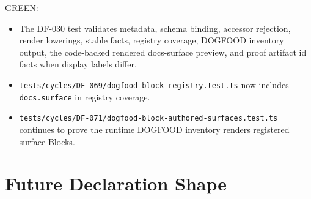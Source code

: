 GREEN:

\begin{itemize}
\tightlist
\item
  The DF-030 test validates metadata, schema binding, accessor rejection, render lowerings, stable facts, registry coverage, DOGFOOD inventory output, the code-backed rendered docs-surface preview, and proof artifact id facts when display labels differ.
\item
  \texttt{t\allowbreak{}e\allowbreak{}s\allowbreak{}t\allowbreak{}s\allowbreak{}/\allowbreak{}c\allowbreak{}y\allowbreak{}c\allowbreak{}l\allowbreak{}e\allowbreak{}s\allowbreak{}/\allowbreak{}D\allowbreak{}F\allowbreak{}-\allowbreak{}0\allowbreak{}6\allowbreak{}9\allowbreak{}/\allowbreak{}d\allowbreak{}o\allowbreak{}g\allowbreak{}f\allowbreak{}o\allowbreak{}o\allowbreak{}d\allowbreak{}-\allowbreak{}b\allowbreak{}l\allowbreak{}o\allowbreak{}c\allowbreak{}k\allowbreak{}-\allowbreak{}r\allowbreak{}e\allowbreak{}g\allowbreak{}i\allowbreak{}s\allowbreak{}t\allowbreak{}r\allowbreak{}y\allowbreak{}.\allowbreak{}t\allowbreak{}e\allowbreak{}s\allowbreak{}t\allowbreak{}.\allowbreak{}t\allowbreak{}s} now includes \texttt{d\allowbreak{}o\allowbreak{}c\allowbreak{}s\allowbreak{}.\allowbreak{}s\allowbreak{}u\allowbreak{}r\allowbreak{}f\allowbreak{}a\allowbreak{}c\allowbreak{}e} in registry coverage.
\item
  \texttt{t\allowbreak{}e\allowbreak{}s\allowbreak{}t\allowbreak{}s\allowbreak{}/\allowbreak{}c\allowbreak{}y\allowbreak{}c\allowbreak{}l\allowbreak{}e\allowbreak{}s\allowbreak{}/\allowbreak{}D\allowbreak{}F\allowbreak{}-\allowbreak{}0\allowbreak{}7\allowbreak{}1\allowbreak{}/\allowbreak{}d\allowbreak{}o\allowbreak{}g\allowbreak{}f\allowbreak{}o\allowbreak{}o\allowbreak{}d\allowbreak{}-\allowbreak{}b\allowbreak{}l\allowbreak{}o\allowbreak{}c\allowbreak{}k\allowbreak{}-\allowbreak{}a\allowbreak{}u\allowbreak{}t\allowbreak{}h\allowbreak{}o\allowbreak{}r\allowbreak{}e\allowbreak{}d\allowbreak{}-\allowbreak{}s\allowbreak{}u\allowbreak{}r\allowbreak{}f\allowbreak{}a\allowbreak{}c\allowbreak{}e\allowbreak{}s\allowbreak{}.\allowbreak{}t\allowbreak{}e\allowbreak{}s\allowbreak{}t\allowbreak{}.\allowbreak{}t\allowbreak{}s} continues to prove the runtime DOGFOOD inventory renders registered surface Blocks.
\end{itemize}

\section{Future Declaration Shape}\label{record-091-future-declaration-shape}

